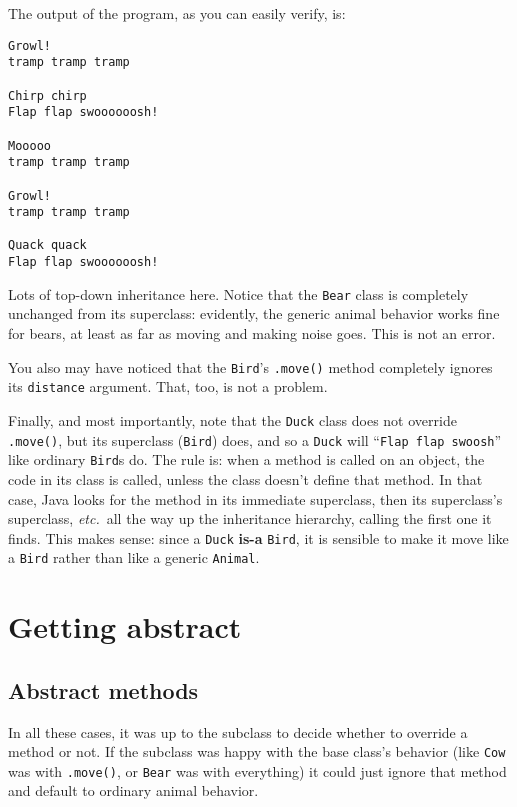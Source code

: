 \begin{samepage}
The output of the program, as you can easily verify, is:

\begin{Verbatim}[fontsize=\footnotesize,samepage=true,frame=single]
Growl!
tramp tramp tramp 

Chirp chirp
Flap flap swoooooosh!

Mooooo
tramp tramp tramp 

Growl!
tramp tramp tramp 

Quack quack
Flap flap swoooooosh!
\end{Verbatim}
\end{samepage}

Lots of top-down inheritance here. Notice that the \texttt{Bear} class is
completely unchanged from its superclass: evidently, the generic animal
behavior works fine for bears, at least as far as moving and making noise
goes. This is not an error.

You also may have noticed that the \texttt{Bird}'s \texttt{.move()} method
completely ignores its \texttt{distance} argument. That, too, is not a
problem.

Finally, and most importantly, note that the \texttt{Duck} class does not
override \texttt{.move()}, but its superclass (\texttt{Bird}) does, and so a
\texttt{Duck} will ``\texttt{Flap flap swoosh}'' like ordinary \texttt{Bird}s
do. The rule is: when a method is called on an object, the code in its class
is called, unless the class doesn't define that method. In that case, Java
looks for the method in its immediate superclass, then its superclass's
superclass, \textit{etc.}~all the way up the inheritance hierarchy, calling
the first one it finds. This makes sense: since a \texttt{Duck} \textbf{is-a}
\texttt{Bird}, it is sensible to make it move like a \texttt{Bird} rather than
like a generic \texttt{Animal}.

\section{Getting abstract}

\subsection{Abstract methods}

In all these cases, it was up to the subclass to decide whether to override a
method or not. If the subclass was happy with the base class's behavior (like
\texttt{Cow} was with \texttt{.move()}, or \texttt{Bear} was with everything)
it could just ignore that method and default to ordinary animal behavior.

